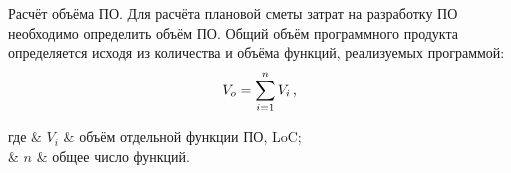 





















Расчёт объёма ПО.  Для расчёта плановой сметы затрат на разработку ПО необходимо определить объём ПО.
Общий объём программного продукта определяется исходя из количества и объёма функций, реализуемых программой:
\begin{equation}
\label{eq:econ:total_program_size}
V_{o} = \sum_{i = 1}^{n} V_{i} \text{\,,}
\end{equation}
\begin{explanation}
	где & $ V_{i} $ & объём отдельной функции ПО, LoC; \\
	& $ n $ & общее число функций.
\end{explanation}

